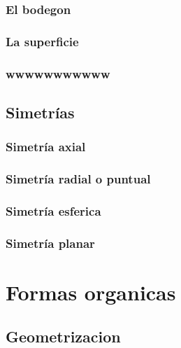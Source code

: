 \documentclass[
  16pt,
]{krantz}
\theoremstyle{definition}
\theoremstyle{definition}
\theoremstyle{definition}
\theoremstyle{definition}
\theoremstyle{remark}
\begin{document}
\hypertarget{el-bodegon}{%
\subsection{El bodegon}\label{el-bodegon}}

\hypertarget{la-superficie}{%
\subsection{La superficie}\label{la-superficie}}

\hypertarget{wwwwwwwwwww}{%
\subsection{wwwwwwwwwww}\label{wwwwwwwwwww}}

\hypertarget{simetruxedas}{%
\section{Simetrías}\label{simetruxedas}}

\hypertarget{simetruxeda-axial}{%
\subsection{Simetría axial}\label{simetruxeda-axial}}

\hypertarget{simetruxeda-radial-o-puntual}{%
\subsection{Simetría radial o puntual}\label{simetruxeda-radial-o-puntual}}

\hypertarget{simetruxeda-esferica}{%
\subsection{Simetría esferica}\label{simetruxeda-esferica}}

\hypertarget{simetruxeda-planar}{%
\subsection{Simetría planar}\label{simetruxeda-planar}}

\hypertarget{formas-organicas}{%
\chapter{Formas organicas}\label{formas-organicas}}

\hypertarget{geometrizacion}{%
\section{Geometrizacion}\label{geometrizacion}}
\end{document}

